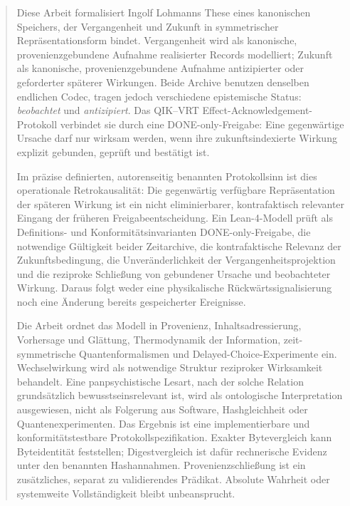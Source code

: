 \documentclass[11pt,a4paper]{article}
\theoremstyle{remark}
\begin{document}

\begin{abstract}
Diese Arbeit formalisiert Ingolf Lohmanns These eines kanonischen Speichers,
der Vergangenheit und Zukunft in symmetrischer Repräsentationsform bindet.
Vergangenheit wird als kanonische, provenienzgebundene Aufnahme realisierter
Records modelliert; Zukunft als kanonische, provenienzgebundene Aufnahme
antizipierter oder geforderter späterer Wirkungen. Beide Archive benutzen
denselben endlichen Codec, tragen jedoch verschiedene epistemische Status:
\emph{beobachtet} und \emph{antizipiert}. Das QIK--VRT
Effect-Acknowledgement-Protokoll verbindet sie durch eine
DONE-only-Freigabe: Eine gegenwärtige Ursache darf nur wirksam werden, wenn
ihre zukunftsindexierte Wirkung explizit gebunden, geprüft und bestätigt ist.

Im präzise definierten, autorenseitig benannten Protokollsinn ist dies
operationale Retrokausalität: Die gegenwärtig verfügbare Repräsentation der
späteren Wirkung ist ein nicht eliminierbarer, kontrafaktisch relevanter
Eingang der früheren Freigabeentscheidung. Ein Lean-4-Modell prüft als
Definitions- und Konformitätsinvarianten
DONE-only-Freigabe, die notwendige Gültigkeit beider Zeitarchive, die
kontrafaktische Relevanz der Zukunftsbedingung, die Unveränderlichkeit der
Vergangenheitsprojektion und die reziproke Schließung von gebundener Ursache
und beobachteter Wirkung. Daraus folgt weder eine physikalische
Rückwärtssignalisierung noch eine Änderung bereits gespeicherter Ereignisse.

Die Arbeit ordnet das Modell in Provenienz, Inhaltsadressierung,
Vorhersage und Glättung, Thermodynamik der Information, zeit-symmetrische
Quantenformalismen und Delayed-Choice-Experimente ein. Wechselwirkung wird als
notwendige Struktur reziproker Wirksamkeit behandelt. Eine panpsychistische
Lesart, nach der solche Relation grundsätzlich bewusstseinsrelevant ist, wird
als ontologische Interpretation ausgewiesen, nicht als Folgerung aus
Software, Hashgleichheit oder Quantenexperimenten. Das Ergebnis ist eine
implementierbare und konformitätstestbare Protokollspezifikation.
Exakter Bytevergleich kann Byteidentität feststellen; Digestvergleich ist
dafür rechnerische Evidenz unter den benannten Hashannahmen.
Provenienzschließung ist ein zusätzliches, separat zu validierendes Prädikat.
Absolute Wahrheit oder systemweite Vollständigkeit bleibt unbeansprucht.
\end{abstract}
\end{document}

